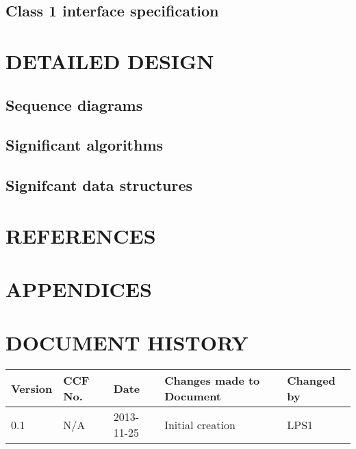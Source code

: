 \documentclass{project}
\begin{document}
\subsection{Class 1 interface specification}
\section{DETAILED DESIGN}
\subsection{Sequence diagrams}
\subsection{Significant algorithms}
\subsection{Signifcant data structures}

\section{REFERENCES}

\section{APPENDICES}

\label{thelastpage}
\section{DOCUMENT HISTORY}
\begin{tabular}{|l | l | l | l | l |}
\hline
Version & CCF No. & Date & Changes made to Document & Changed by \\
\hline
0.1 & N/A & 2013-11-25 & Initial creation & LPS1 \\
\hline
\end{tabular}
\label{thelastpage}
\end{document}

